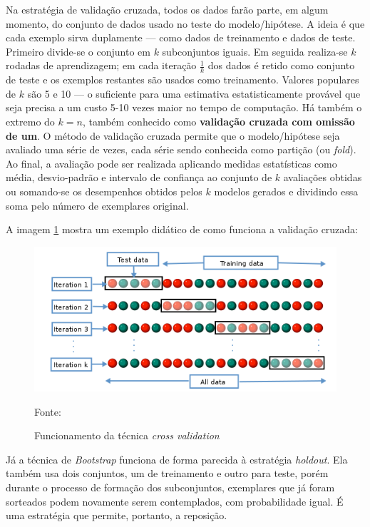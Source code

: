 Na estratégia de validação cruzada, todos os dados farão parte, em algum momento, do conjunto de dados usado no teste do modelo/hipótese. A ideia é que cada exemplo sirva duplamente --- como dados de treinamento e dados de teste. Primeiro divide-se o conjunto em $k$ subconjuntos iguais. Em seguida realiza-se $k$ rodadas de aprendizagem; em cada iteração $\frac{1}{k}$ dos dados é retido como conjunto de teste e os exemplos restantes são usados como treinamento. Valores populares de $k$ são 5 e 10 --- o suficiente para uma estimativa estatisticamente provável que seja precisa a um custo 5-10 vezes maior no tempo de computação. Há também o extremo do $k = n$, também conhecido como \textbf{validação cruzada com omissão de um}. O método de validação cruzada permite que o modelo/hipótese seja avaliado uma série de vezes, cada série sendo conhecida como partição (ou \textit{fold}). Ao final, a avaliação pode ser realizada aplicando medidas estatísticas como média, desvio-padrão e intervalo de confiança ao conjunto de $k$ avaliações obtidas ou somando-se os desempenhos obtidos pelos $k$ modelos gerados e dividindo essa soma pelo número de exemplares original. \cite{Norvig2013}\cite{Boscarioli2017}\cite{ferrari2017} \cite{aprenda_mineracao_fernando_amaral16}

A imagem \ref{fig:img_cross_validation} mostra um exemplo didático de como funciona a validação cruzada:

\begin{figure}[h!]
	\centering
	\includegraphics[width=.6\textwidth]{imagens/cross_validation.png}
	\caption{Funcionamento da técnica \textit{cross validation}}
	{\scriptsize Fonte:\cite{fold_cross_validation:k-fold_nodate}}
	\label{fig:img_cross_validation}
\end{figure}

Já a técnica de \textit{Bootstrap} funciona de forma  parecida à estratégia \textit{holdout}. Ela também usa dois conjuntos, um de treinamento e outro para teste, porém durante o processo de formação dos subconjuntos, exemplares que já foram sorteados podem novamente serem contemplados, com probabilidade igual. É uma estratégia que permite, portanto, a reposição.


